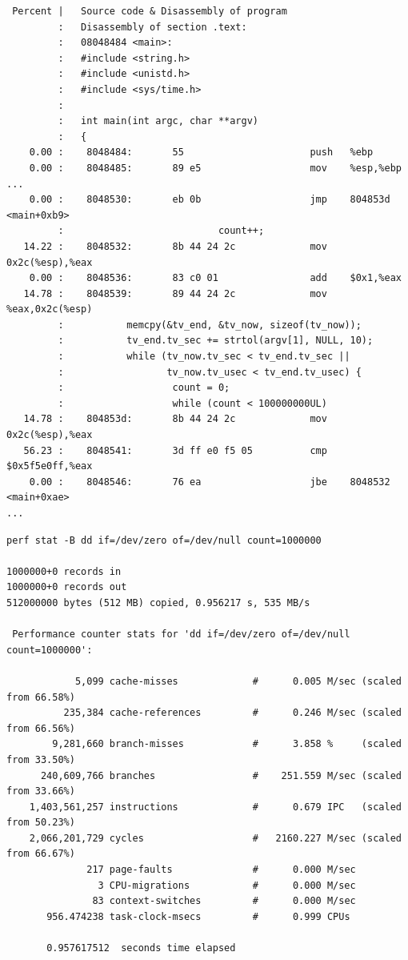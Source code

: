 \documentclass[a4paper]{report}
\begin{document}
\begin{lstlisting}
 Percent |   Source code & Disassembly of program
         :   Disassembly of section .text:
         :   08048484 <main>:
         :   #include <string.h>
         :   #include <unistd.h>
         :   #include <sys/time.h>
         :
         :   int main(int argc, char **argv)
         :   {
    0.00 :    8048484:       55                      push   %ebp
    0.00 :    8048485:       89 e5                   mov    %esp,%ebp
...
    0.00 :    8048530:       eb 0b                   jmp    804853d <main+0xb9>
         :                           count++;
   14.22 :    8048532:       8b 44 24 2c             mov    0x2c(%esp),%eax
    0.00 :    8048536:       83 c0 01                add    $0x1,%eax
   14.78 :    8048539:       89 44 24 2c             mov    %eax,0x2c(%esp)
         :           memcpy(&tv_end, &tv_now, sizeof(tv_now));
         :           tv_end.tv_sec += strtol(argv[1], NULL, 10);
         :           while (tv_now.tv_sec < tv_end.tv_sec ||
         :                  tv_now.tv_usec < tv_end.tv_usec) {
         :                   count = 0;
         :                   while (count < 100000000UL)
   14.78 :    804853d:       8b 44 24 2c             mov    0x2c(%esp),%eax
   56.23 :    8048541:       3d ff e0 f5 05          cmp    $0x5f5e0ff,%eax
    0.00 :    8048546:       76 ea                   jbe    8048532 <main+0xae>
...
\end{lstlisting}

\begin{lstlisting}
perf stat -B dd if=/dev/zero of=/dev/null count=1000000

1000000+0 records in
1000000+0 records out
512000000 bytes (512 MB) copied, 0.956217 s, 535 MB/s

 Performance counter stats for 'dd if=/dev/zero of=/dev/null count=1000000':

            5,099 cache-misses             #      0.005 M/sec (scaled from 66.58%)
          235,384 cache-references         #      0.246 M/sec (scaled from 66.56%)
        9,281,660 branch-misses            #      3.858 %     (scaled from 33.50%)
      240,609,766 branches                 #    251.559 M/sec (scaled from 33.66%)
    1,403,561,257 instructions             #      0.679 IPC   (scaled from 50.23%)
    2,066,201,729 cycles                   #   2160.227 M/sec (scaled from 66.67%)
              217 page-faults              #      0.000 M/sec
                3 CPU-migrations           #      0.000 M/sec
               83 context-switches         #      0.000 M/sec
       956.474238 task-clock-msecs         #      0.999 CPUs

       0.957617512  seconds time elapsed
\end{lstlisting}
\end{document}

